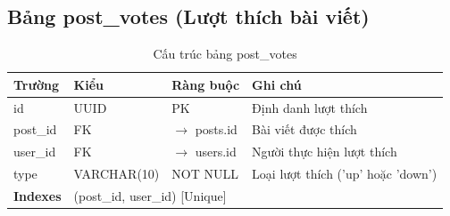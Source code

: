 \documentclass[12pt,a4paper]{article}
\begin{document}
\subsection{Bảng post\_votes (Lượt thích bài viết)}
\begin{longtable}{|l|l|l|p{5.5cm}|}
    \caption{Cấu trúc bảng post\_votes}                                                                                                 \\
    \hline
    \rowcolor{headerblue}
    \textbf{Trường}  & \textbf{Kiểu}                                      & \textbf{Ràng buộc}     & \textbf{Ghi chú}                   \\
    \hline
    id               & UUID                                               & PK                     & Định danh lượt thích               \\
    \hline
    post\_id         & FK                                                 & $\rightarrow$ posts.id & Bài viết được thích                \\
    \hline
    user\_id         & FK                                                 & $\rightarrow$ users.id & Người thực hiện lượt thích         \\
    \hline
    type             & VARCHAR(10)                                        & NOT NULL               & Loại lượt thích ('up' hoặc 'down') \\
    \hline
    \rowcolor{headerblue}
    \textbf{Indexes} & \multicolumn{3}{l|}{(post\_id, user\_id) [Unique]}                                                               \\
    \hline
\end{longtable}
\end{document}
